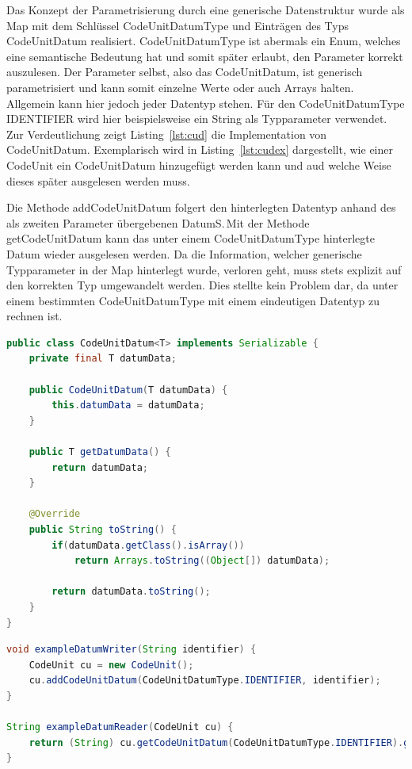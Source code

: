\documentclass[12pt,oneside,a4paper,parskip]{scrbook}
\begin{document}
Das Konzept der Parametrisierung durch eine generische Datenstruktur wurde als Map mit dem Schlüssel CodeUnitDatumType und Einträgen des Typs CodeUnitDatum realisiert. CodeUnitDatumType ist abermals ein Enum, welches eine semantische Bedeutung hat und somit später erlaubt, den Parameter korrekt auszulesen. Der Parameter selbst, also das CodeUnitDatum, ist generisch parametrisiert und kann somit einzelne Werte oder auch Arrays halten. Allgemein kann hier jedoch jeder Datentyp stehen. Für den CodeUnitDatumType IDENTIFIER wird hier beispielsweise ein String als Typparameter verwendet. Zur Verdeutlichung zeigt Listing~\ref{lst:cud} die Implementation von CodeUnitDatum. Exemplarisch wird in Listing~\ref{lst:cudex} dargestellt, wie einer CodeUnit ein CodeUnitDatum hinzugefügt werden kann und aud welche Weise dieses später ausgelesen werden muss.

Die Methode addCodeUnitDatum folgert den hinterlegten Datentyp anhand des als zweiten Parameter übergebenen DatumS.\,Mit der Methode getCodeUnitDatum kann das unter einem CodeUnitDatumType hinterlegte Datum wieder ausgelesen werden. Da die Information, welcher generische Typparameter in der Map hinterlegt wurde, verloren geht, muss stets explizit auf den korrekten Typ umgewandelt werden. Dies stellte kein Problem dar, da unter einem bestimmten CodeUnitDatumType mit einem eindeutigen Datentyp zu rechnen ist.

\begin{lstlisting}[label=lst:cud,
language=java,
firstnumber=1,
caption=Implementation der Klasse CodeUnitDatum.]
public class CodeUnitDatum<T> implements Serializable {
	private final T datumData;
	
	public CodeUnitDatum(T datumData) {
		this.datumData = datumData;
	}
	
	public T getDatumData() {
		return datumData;
	}
	
	@Override
	public String toString() {
		if(datumData.getClass().isArray())
			return Arrays.toString((Object[]) datumData);
		
		return datumData.toString();
	}
}
\end{lstlisting}

\begin{lstlisting}[label=lst:cudex,
language=java,
firstnumber=1,
caption=Beispiel zum hinterlegen und auslesen eines CodeUnitDatums.]
void exampleDatumWriter(String identifier) {
	CodeUnit cu = new CodeUnit();
	cu.addCodeUnitDatum(CodeUnitDatumType.IDENTIFIER, identifier);
}
	
String exampleDatumReader(CodeUnit cu) {
	return (String) cu.getCodeUnitDatum(CodeUnitDatumType.IDENTIFIER).getDatumData();
}
\end{lstlisting}
\end{document}
